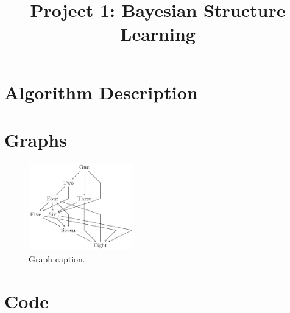 \documentclass[twoside,11pt]{article}
\begin{document}
\title{Project 1: Bayesian Structure Learning}



\maketitle


\section{Algorithm Description}
\lipsum[2]



\section{Graphs}
\begin{figure}[h]
    \centering
    \includegraphics[width=0.4\textwidth]{example_graph.pdf}
    \caption{Graph caption.}
\end{figure}



\section{Code}
\end{document}
